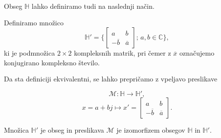\documentclass[mat1, tisk]{fmfdelo}
\numberwithin{equation}{section}
\begin{document}
Obseg $\mathbb{H}$ lahko definiramo tudi na naslednji način.

\begin{definicija}
    Definiramo množico
    $$\mathbb{H}' = \Biggl\{
        \begin{bmatrix}
            a & b\\
            - \overline{b} & \overline{a}
        \end{bmatrix}
        ; \, a, b \in \mathbb{C}
        \Biggr\},$$
        ki je podmnožica $2 \times 2$ kompleksnih matrik, pri čemer z $\overline{x}$ označujemo konjugirano kompleksno število.
\end{definicija}
Da sta definiciji ekvivalentni, se lahko prepričamo z vpeljavo preslikave

\[ \mathscr{M}: \mathbb{H} \rightarrow \mathbb{H}', \]
\[  x = a + bj \longmapsto x' = 
    \begin{bmatrix}
        a & b\\
        - \overline{b} & \overline{a}
    \end{bmatrix}.
\]

\begin{trditev}
    Množica $\mathbb{H}'$ je obseg in preslikava $\mathscr{M}$ je izomorfizem obsegov $\mathbb{H}$ in $\mathbb{H}'$.
\end{trditev}
\end{document}
